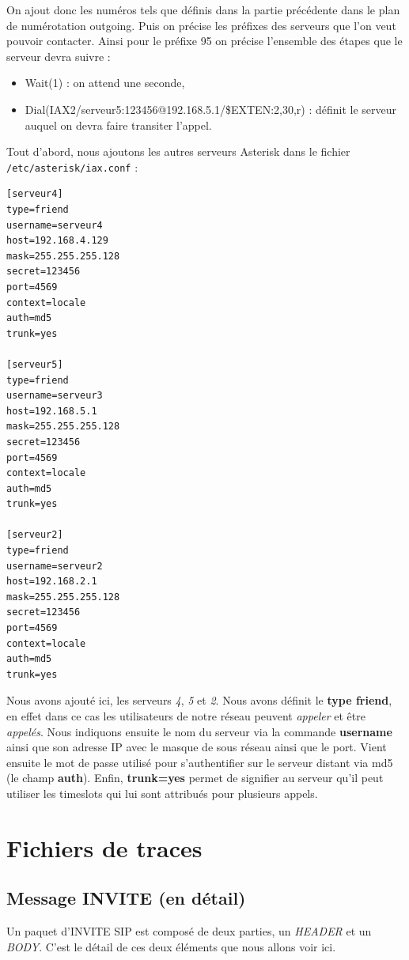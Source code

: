 \documentclass[12pt,a4paper,notitlepage]{article}
\begin{document}
On ajout donc les numéros tels que définis dans la partie précédente dans le plan de numérotation outgoing. Puis on précise les préfixes des serveurs que l'on veut pouvoir contacter. Ainsi pour le préfixe 95 on précise l'ensemble des étapes que le serveur devra suivre :
\begin{itemize}
\item Wait(1) : on attend une seconde,
\item Dial(IAX2/serveur5:123456@192.168.5.1/\${EXTEN:2},30,r) : définit le serveur auquel on devra faire transiter l'appel.
\end{itemize}


Tout d’abord, nous ajoutons les autres serveurs Asterisk dans le fichier \\
\texttt{/etc/asterisk/iax.conf} :

\begin{lstlisting}[title=Fichier IAX.conf]
[serveur4]
type=friend
username=serveur4
host=192.168.4.129
mask=255.255.255.128
secret=123456
port=4569
context=locale
auth=md5
trunk=yes

[serveur5]
type=friend
username=serveur3
host=192.168.5.1
mask=255.255.255.128
secret=123456
port=4569
context=locale
auth=md5
trunk=yes

[serveur2]
type=friend
username=serveur2
host=192.168.2.1
mask=255.255.255.128
secret=123456
port=4569
context=locale
auth=md5
trunk=yes
\end{lstlisting}
Nous avons ajouté ici, les serveurs \textit{4}, \textit{5} et \textit{2}. Nous avons définit le \textbf{type friend}, en effet dans ce cas les utilisateurs de notre réseau peuvent \textit{appeler} et être \textit{appelés}. Nous indiquons ensuite le nom du serveur via la commande \textbf{username} ainsi que son adresse IP avec le masque de sous réseau ainsi que le port. Vient ensuite le mot de passe utilisé pour s'authentifier sur le serveur distant via md5 (le champ \textbf{auth}). Enfin, \textbf{trunk=yes} permet de signifier au serveur qu'il peut utiliser les timeslots qui lui sont attribués pour plusieurs appels.

\section{Fichiers de traces}
\subsection{Message INVITE (en détail)}
Un paquet d'INVITE SIP est composé de deux parties, un \textit{HEADER} et un  \textit{BODY}. C'est le détail de ces deux éléments que nous allons voir ici. 
\end{document}
